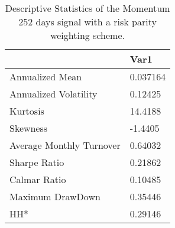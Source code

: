 \begin{table}[H]
\centering
\begin{tabular}{ll}
\hline& Var1 \\ 
\hline 
Annualized Mean & 0.037164 \\ 
Annualized Volatility & 0.12425 \\ 
Kurtosis & 14.4188 \\ 
Skewness & -1.4405 \\ 
Average Monthly Turnover & 0.64032 \\ 
Sharpe Ratio & 0.21862 \\ 
Calmar Ratio & 0.10485 \\ 
Maximum DrawDown & 0.35446 \\ 
HH* & 0.29146 \\ 
\hline
\end{tabular}
\caption{Descriptive Statistics of the Momentum 252 days signal with a risk parity weighting scheme.}
\label{MOM252RP}
\end{table}